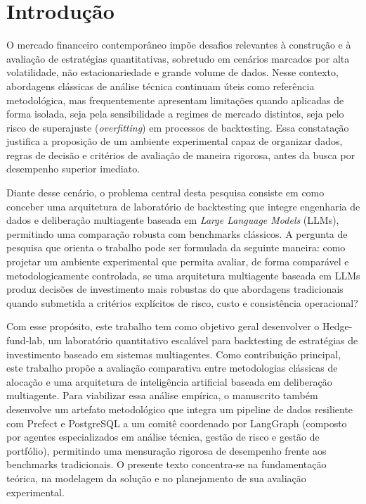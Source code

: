 \documentclass{eic-bcc-tcc}
\begin{document}
\listoffigurespage
\listoftablespage
\listofacronymspage
\tableofcontentspage

\mainmatter

\chapter{Introdução}
\label{cha:introducao}

O mercado financeiro contemporâneo impõe desafios relevantes à construção e à avaliação de estratégias quantitativas, sobretudo em cenários marcados por alta volatilidade, não estacionariedade e grande volume de dados. Nesse contexto, abordagens clássicas de análise técnica continuam úteis como referência metodológica, mas frequentemente apresentam limitações quando aplicadas de forma isolada, seja pela sensibilidade a regimes de mercado distintos, seja pelo risco de superajuste (\textit{overfitting}) em processos de backtesting. Essa constatação justifica a proposição de um ambiente experimental capaz de organizar dados, regras de decisão e critérios de avaliação de maneira rigorosa, antes da busca por desempenho superior imediato.

Diante desse cenário, o problema central desta pesquisa consiste em como conceber uma arquitetura de laboratório de backtesting que integre engenharia de dados e deliberação multiagente baseada em \textit{Large Language Models} (LLMs), permitindo uma comparação robusta com benchmarks clássicos. A pergunta de pesquisa que orienta o trabalho pode ser formulada da seguinte maneira: como projetar um ambiente experimental que permita avaliar, de forma comparável e metodologicamente controlada, se uma arquitetura multiagente baseada em LLMs produz decisões de investimento mais robustas do que abordagens tradicionais quando submetida a critérios explícitos de risco, custo e consistência operacional?

Com esse propósito, este trabalho tem como objetivo geral desenvolver o Hedge-fund-lab, um laboratório quantitativo escalável para backtesting de estratégias de investimento baseado em sistemas multiagentes. Como contribuição principal, este trabalho propõe a avaliação comparativa entre metodologias clássicas de alocação e uma arquitetura de inteligência artificial baseada em deliberação multiagente. Para viabilizar essa análise empírica, o manuscrito também desenvolve um artefato metodológico que integra um pipeline de dados resiliente com Prefect e PostgreSQL a um comitê coordenado por LangGraph (composto por agentes especializados em análise técnica, gestão de risco e gestão de portfólio), permitindo uma mensuração rigorosa de desempenho frente aos benchmarks tradicionais. O presente texto concentra-se na fundamentação teórica, na modelagem da solução e no planejamento de sua avaliação experimental.
\end{document}
